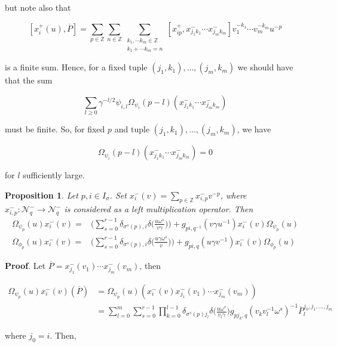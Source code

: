 \documentclass[12pt]{amsart}
\newtheorem{prop}[thm]{Proposition}
\numberwithin{equation}{section}
\newcommand{\dem }{\noindent\textbf{Proof}. }
\newcommand{\Z}{\ensuremath{\mathbb{Z}}}
\newcommand{\mc}[1]{\mathcal{#1}}
\begin{document}
but note also that 

$$ [x_i^{+}(u), \overline{P}] =  \sum_{p\in\Z}\sum_{n\in\Z}\sum_{\substack{k_1, \cdots k_m \in \Z \\ k_1 + \cdots k_m = n}}[x^{+}_{ip},x_{j_1k_1}^{-}\cdots x_{j_m k_m}^{-}]v_1^{-k_1}\cdots v_m^{-k_m}u^{-p}$$

is a finite sum. Hence, for a fixed tuple $(j_1,k_1), \ldots, (j_m,k_m)$ we should have that the sum 

$$ \sum_{l\geq 0} \gamma^{-l/2}\psi_{i,l}\Omega_{\psi_i}(p-l)(x_{j_1k_1}^{-}\cdots x_{j_mk_m}^{-})$$

must be finite. So, for fixed $p$ and tuple  $(j_1,k_1), \ldots, (j_m,k_m)$, we have 

$$ \Omega_{\psi_i}(p-l)(x_{j_1k_1}^{-}\cdots x_{j_mk_m}^{-}) = 0 $$

for $l$ sufficiently large. \\

\begin{prop}\label{Omega_x_commrealtions}
    Let $p,i\in I_\sigma$. Set $x_i^{-}(v) = \sum_{p\in \Z} x_{i,p}^{-}v^{-p}$, where $x_{i,p}^{-} : \mc{N}_q^- \to \mc{N}_q^-$ is considered as a left multiplication operator. Then
    \begin{align}
        \Omega_{\psi_p}(u)x_i^{-}(v) =& \Big(\sum_{s=0}^{r-1}\delta_{\sigma^s(p),i}\delta\Big(\frac{u\omega^s}{v\gamma}\Big)\Big) + g_{pi,q^{-1}}(v\gamma u^{-1})x_i^{-}(v)\Omega_{\psi_p}(u)  \label{eq_comm01_gen} \\
        \Omega_{\phi_p}(u)x_i^{-}(v) =& \Big(\sum_{s=0}^{r-1}\delta_{\sigma^s(p),i}\delta\Big(\frac{u\gamma \omega^s}{v}\Big)\Big) + g_{pi,q}(u\gamma v^{-1})x_i^{-}(v)\Omega_{\phi_p}(u)\label{eq_comm02_gen}
    \end{align}
\end{prop}

\dem Let $\overline{P} = x_{j_1}^{-}(v_1)\cdots x_{j_m}^{-}(v_m)$, then 

\begin{align*}
    \Omega_{\psi_p}(u)x_i^{-}(v)(\overline{P}) &= \Omega_{\psi_p}(u)(x_i^{-}(v)x_{j_1}^{-}(v_1)\cdots x_{j_m}^{-}(v_m))\\
    &= \sum_{l=0}^{m}  \sum_{s=0}^{r-1} \prod_{k=0}^{l-1}\delta_{\sigma^s(p)j_l}\delta\Big(\frac{u \omega^s}{v_l\gamma }\Big)   g_{pj_k,q}(v_{k}v_l^{-1}\omega^s)^{-1} \overline{P}_l^{j_0,j_1, \ldots, j_m}
\end{align*}

where $j_0=i$. Then,
\end{document}
